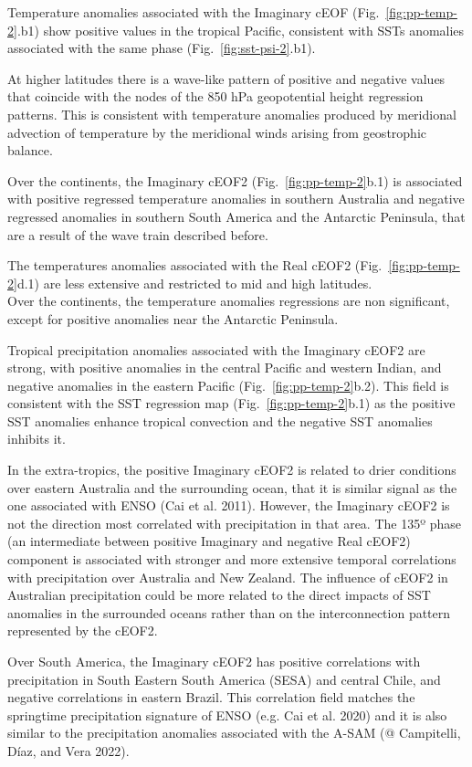 \documentclass[smallextended]{svjour3}       %
\begin{document}
Temperature anomalies associated with the Imaginary cEOF (Fig.~\ref{fig:pp-temp-2}.b1) show positive values in the tropical Pacific, consistent with SSTs anomalies associated with the same phase (Fig.~\ref{fig:sst-psi-2}.b1).

At higher latitudes there is a wave-like pattern of positive and negative values that coincide with the nodes of the 850 hPa geopotential height regression patterns.
This is consistent with temperature anomalies produced by meridional advection of temperature by the meridional winds arising from geostrophic balance.

Over the continents, the Imaginary cEOF2 (Fig.~\ref{fig:pp-temp-2}b.1) is associated with positive regressed temperature anomalies in southern Australia and negative regressed anomalies in southern South America and the Antarctic Peninsula, that are a result of the wave train described before.

The temperatures anomalies associated with the Real cEOF2 (Fig.~\ref{fig:pp-temp-2}d.1) are less extensive and restricted to mid and high latitudes.\\
Over the continents, the temperature anomalies regressions are non significant, except for positive anomalies near the Antarctic Peninsula.

Tropical precipitation anomalies associated with the Imaginary cEOF2 are strong, with positive anomalies in the central Pacific and western Indian, and negative anomalies in the eastern Pacific (Fig.~\ref{fig:pp-temp-2}b.2).
This field is consistent with the SST regression map (Fig.~\ref{fig:pp-temp-2}b.1) as the positive SST anomalies enhance tropical convection and the negative SST anomalies inhibits it.

In the extra-tropics, the positive Imaginary cEOF2 is related to drier conditions over eastern Australia and the surrounding ocean, that it is similar signal as the one associated with ENSO (Cai et al. 2011).
However, the Imaginary cEOF2 is not the direction most correlated with precipitation in that area.
The 135º phase (an intermediate between positive Imaginary and negative Real cEOF2) component is associated with stronger and more extensive temporal correlations with precipitation over Australia and New Zealand.
The influence of cEOF2 in Australian precipitation could be more related to the direct impacts of SST anomalies in the surrounded oceans rather than on the interconnection pattern represented by the cEOF2.

Over South America, the Imaginary cEOF2 has positive correlations with precipitation in South Eastern South America (SESA) and central Chile, and negative correlations in eastern Brazil. This correlation field matches the springtime precipitation signature of ENSO (e.g. Cai et al. 2020) and it is also similar to the precipitation anomalies associated with the A-SAM (@ Campitelli, Díaz, and Vera 2022).
\end{document}
